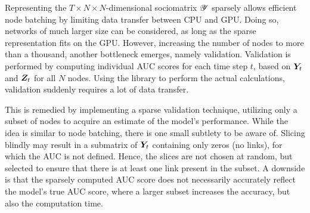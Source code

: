     Representing the $T\times N\times N$-dimensional sociomatrix $\bm{\mathscr{Y}}$ sparsely allows efficient node batching by limiting data transfer between CPU and GPU. Doing so, networks of much larger size can be considered, as long as the sparse representation fits on the GPU. However, increasing the number of nodes to more than a thousand, another bottleneck emerges, namely validation. Validation is performed by computing individual AUC scores for each time step $t$, based on $\bm{Y}_t$ and $\bm{Z}_t$ for all $N$ nodes. Using the \href{https://scikit-learn.org/stable/}{\color{blue}{scikit-learn}} library to perform the actual calculations, validation suddenly requires a lot of data transfer.
    
    This is remedied by implementing a sparse validation technique, utilizing only a subset of nodes to acquire an estimate of the model's performance. While the idea is similar to node batching, there is one small subtlety to be aware of. Slicing blindly may result in a submatrix of $\bm{Y}_t$ containing only zeros (no links), for which the AUC is not defined. Hence, the slices are not chosen at random, but selected to ensure that there is at least one link present in the subset.
    A downside is that the sparsely computed AUC score does not necessarily accurately reflect the model's true AUC score, where a larger subset increases the accuracy, but also the computation time.
    